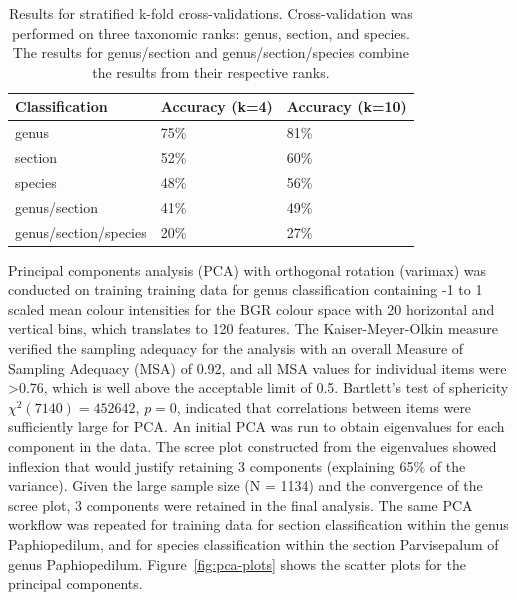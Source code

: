 \documentclass[twocolumn]{bmcart}
\begin{document}
\begin{table}[h]\footnotesize
    \caption{Results for stratified k-fold cross-validations. Cross-validation was performed on three taxonomic ranks: genus, section, and species. The results for genus/section and genus/section/species combine the results from their respective ranks.}
    \begin{center}
    \begin{tabular}{lp{1.5cm}p{1.5cm}}
    \toprule
    \textbf{Classification} & \textbf{Accuracy (k=4)} & \textbf{Accuracy (k=10)} \\
    \midrule
    genus                   & 75\%    & 81\% \\
    section                 & 52\%    & 60\% \\
    species                 & 48\%    & 56\% \\
    genus/section           & 41\%    & 49\% \\
    genus/section/species   & 20\%    & 27\% \\
    \bottomrule
    \end{tabular}
    \end{center}
    \label{tbl:x-validation-results}
\end{table}

Principal components analysis (PCA) with orthogonal rotation (varimax) was conducted on training training data for genus classification containing -1 to 1 scaled mean colour intensities for the BGR colour space with 20 horizontal and vertical bins, which translates to 120 features. The Kaiser-Meyer-Olkin measure verified the sampling adequacy for the analysis with an overall Measure of Sampling Adequacy (MSA) of 0.92, and all MSA values for individual items were >0.76, which is well above the acceptable limit of 0.5. Bartlett's test of sphericity $\chi^2 (7140) = 452642$, $p = 0$, indicated that correlations between items were sufficiently large for PCA. An initial PCA was run to obtain eigenvalues for each component in the data. The scree plot constructed from the eigenvalues showed inflexion that would justify retaining 3 components (explaining 65\% of the variance). Given the large sample size (N = 1134) and the convergence of the scree plot, 3 components were retained in the final analysis. The same PCA workflow was repeated for training data for section classification within the genus Paphiopedilum, and for species classification within the section Parvisepalum of genus Paphiopedilum. Figure~\ref{fig:pca-plots} shows the scatter plots for the principal components.
\end{document}
